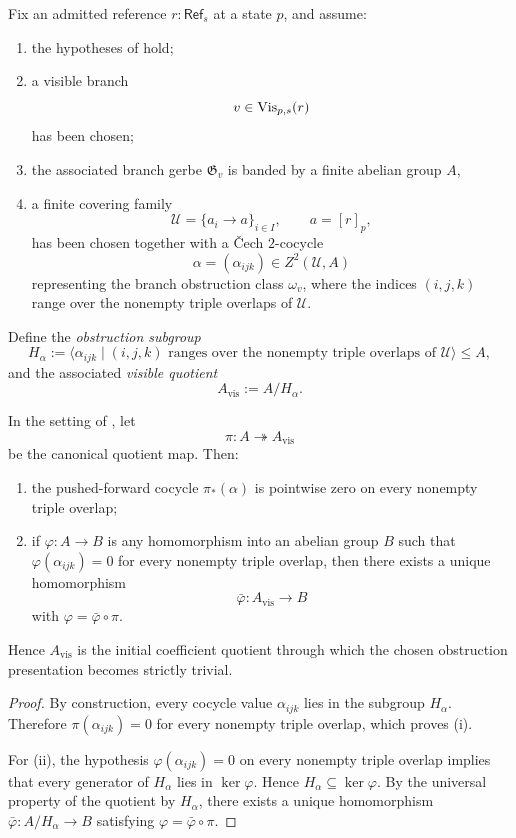 \begin{definition}\label{def:finite-obstruction-presentation}
Fix an admitted reference $r:\mathsf{Ref}_s$ at a state $p$, and assume:
\begin{enumerate}[label=(\roman*),nosep]
\item the hypotheses of  hold;
\item a visible branch
\[
v\in \mathrm{Vis}_{p,s}(r)
\]
has been chosen;
\item the associated branch gerbe $\mathfrak G_v$ is banded by a finite abelian group $A$,
\item a finite covering family
\[
\mathcal U=\{a_i\to a\}_{i\in I},
\qquad
a=[r]_p,
\]
has been chosen together with a \v{C}ech $2$-cocycle
\[
\alpha=(\alpha_{ijk})\in Z^2(\mathcal U,A)
\]
representing the branch obstruction class $\omega_v$, where the indices $(i,j,k)$ range over the nonempty triple overlaps of $\mathcal U$.
\end{enumerate}
Define the \emph{obstruction subgroup}
\[
H_\alpha:=\langle \alpha_{ijk}\mid (i,j,k)\text{ ranges over the nonempty triple overlaps of }\mathcal U\rangle\le A,
\]
and the associated \emph{visible quotient}
\[
A_{\mathrm{vis}}:=A/H_\alpha.
\]
\end{definition}

\begin{proposition}\label{thm:initial-visible-quotient}
In the setting of , let
\[
\pi:A\twoheadrightarrow A_{\mathrm{vis}}
\]
be the canonical quotient map. Then:
\begin{enumerate}[label=(\roman*),nosep]
\item the pushed-forward cocycle $\pi_*(\alpha)$ is pointwise zero on every nonempty triple overlap;
\item if $\varphi:A\to B$ is any homomorphism into an abelian group $B$ such that $\varphi(\alpha_{ijk})=0$ for every nonempty triple overlap, then there exists a unique homomorphism
\[
\bar\varphi:A_{\mathrm{vis}}\to B
\]
with $\varphi=\bar\varphi\circ\pi$.
\end{enumerate}
Hence $A_{\mathrm{vis}}$ is the initial coefficient quotient through which the chosen obstruction presentation becomes strictly trivial.
\end{proposition}

\begin{proof}
By construction, every cocycle value $\alpha_{ijk}$ lies in the subgroup $H_\alpha$. Therefore $\pi(\alpha_{ijk})=0$ for every nonempty triple overlap, which proves (i).

For (ii), the hypothesis $\varphi(\alpha_{ijk})=0$ on every nonempty triple overlap implies that every generator of $H_\alpha$ lies in $\ker\varphi$. Hence $H_\alpha\subseteq\ker\varphi$. By the universal property of the quotient by $H_\alpha$, there exists a unique homomorphism $\bar\varphi:A/H_\alpha\to B$ satisfying $\varphi=\bar\varphi\circ\pi$.
\end{proof}

